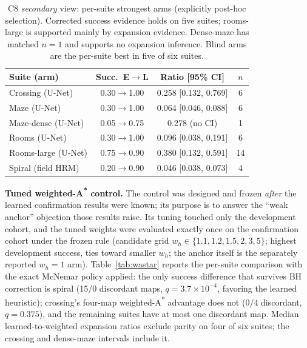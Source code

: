 \documentclass[letterpaper]{article} %
\newcommand{\stage}[1]{\textsc{#1}}
\begin{document}
\begin{table}[t]
\centering
\small
\setlength{\tabcolsep}{3pt}
\begin{tabular}{@{}lccc@{}}
\toprule
Suite (arm) & Succ.\ E$\to$L & Ratio [95\% CI] & $n$ \\
\midrule
Crossing (U-Net) & 0.30$\to$1.00 & 0.258 [0.132, 0.769] & 6 \\
Maze (U-Net) & 0.30$\to$1.00 & 0.064 [0.046, 0.088] & 6 \\
Maze-dense (U-Net) & 0.05$\to$0.75 & 0.278 (no CI) & 1 \\
Rooms (U-Net) & 0.30$\to$1.00 & 0.096 [0.038, 0.191] & 6 \\
Rooms-large (U-Net) & 0.75$\to$0.90 & 0.380 [0.132, 0.591] & 14 \\
Spiral (field HRM) & 0.20$\to$0.90 & 0.046 [0.038, 0.073] & 4 \\
\bottomrule
\end{tabular}
\caption{\stage{C8} \emph{secondary} view: per-suite strongest arms (explicitly post-hoc selection). Corrected success evidence holds on five suites; rooms-large is supported mainly by expansion evidence. Dense-maze has matched $n{=}1$ and supports no expansion inference. Blind arms are the per-suite best in five of six suites.}
\label{tab:c8}
\end{table}


\textbf{Tuned weighted-A\textsuperscript{*} control.} The control was designed and frozen \emph{after} the learned confirmation results were known; its purpose is to answer the ``weak anchor'' objection those results raise. Its tuning touched only the development cohort, and the tuned weights were evaluated exactly once on the confirmation cohort under the frozen rule (candidate grid $w_h \in \{1.1, 1.2, 1.5, 2, 3, 5\}$; highest development success, ties toward smaller $w_h$; the anchor itself is the separately reported $w_h{=}1$ arm). Table~\ref{tab:wastar} reports the per-suite comparison with the exact McNemar policy applied: the only success difference that survives BH correction is spiral (15/0 discordant maps, $q{=}3.7{\times}10^{-4}$, favoring the learned heuristic); crossing's four-map weighted-A\textsuperscript{*} advantage does not ($0/4$ discordant, $q{=}0.375$), and the remaining suites have at most one discordant map. Median learned-to-weighted expansion ratios exclude parity on four of six suites; the crossing and dense-maze intervals include it.
\end{document}

